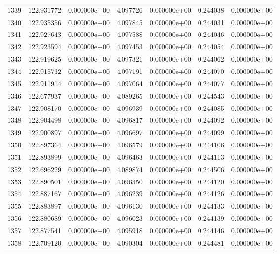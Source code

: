 \begin{tabular}{rrrrrrr}
1339 & 122.931772 &  0.000000e+00 &  4.097726 &  0.000000e+00 &    0.244038 &  0.000000e+00 \\
1340 & 122.935356 &  0.000000e+00 &  4.097845 &  0.000000e+00 &    0.244031 &  0.000000e+00 \\
1341 & 122.927643 &  0.000000e+00 &  4.097588 &  0.000000e+00 &    0.244046 &  0.000000e+00 \\
1342 & 122.923594 &  0.000000e+00 &  4.097453 &  0.000000e+00 &    0.244054 &  0.000000e+00 \\
1343 & 122.919625 &  0.000000e+00 &  4.097321 &  0.000000e+00 &    0.244062 &  0.000000e+00 \\
1344 & 122.915732 &  0.000000e+00 &  4.097191 &  0.000000e+00 &    0.244070 &  0.000000e+00 \\
1345 & 122.911914 &  0.000000e+00 &  4.097064 &  0.000000e+00 &    0.244077 &  0.000000e+00 \\
1346 & 122.677937 &  0.000000e+00 &  4.089265 &  0.000000e+00 &    0.244543 &  0.000000e+00 \\
1347 & 122.908170 &  0.000000e+00 &  4.096939 &  0.000000e+00 &    0.244085 &  0.000000e+00 \\
1348 & 122.904498 &  0.000000e+00 &  4.096817 &  0.000000e+00 &    0.244092 &  0.000000e+00 \\
1349 & 122.900897 &  0.000000e+00 &  4.096697 &  0.000000e+00 &    0.244099 &  0.000000e+00 \\
1350 & 122.897364 &  0.000000e+00 &  4.096579 &  0.000000e+00 &    0.244106 &  0.000000e+00 \\
1351 & 122.893899 &  0.000000e+00 &  4.096463 &  0.000000e+00 &    0.244113 &  0.000000e+00 \\
1352 & 122.696229 &  0.000000e+00 &  4.089874 &  0.000000e+00 &    0.244506 &  0.000000e+00 \\
1353 & 122.890501 &  0.000000e+00 &  4.096350 &  0.000000e+00 &    0.244120 &  0.000000e+00 \\
1354 & 122.887167 &  0.000000e+00 &  4.096239 &  0.000000e+00 &    0.244126 &  0.000000e+00 \\
1355 & 122.883897 &  0.000000e+00 &  4.096130 &  0.000000e+00 &    0.244133 &  0.000000e+00 \\
1356 & 122.880689 &  0.000000e+00 &  4.096023 &  0.000000e+00 &    0.244139 &  0.000000e+00 \\
1357 & 122.877541 &  0.000000e+00 &  4.095918 &  0.000000e+00 &    0.244146 &  0.000000e+00 \\
1358 & 122.709120 &  0.000000e+00 &  4.090304 &  0.000000e+00 &    0.244481 &  0.000000e+00 \\

\end{tabular}
